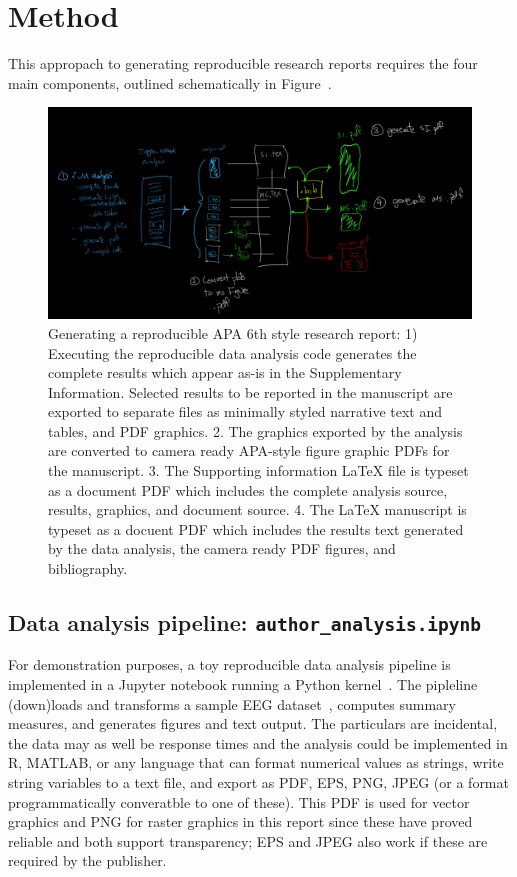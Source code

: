 \documentclass[helv,10pt,man,floatsintext]{apa6}  %
\begin{document}
\section{Method}

This appropach to generating reproducible research reports requires
the four main components, outlined schematically in
Figure~.

\begin{figure}[ht]
\caption{Generating a reproducible APA 6th style research report: 1)
  Executing the reproducible data analysis code generates the complete
  results which appear as-is in the Supplementary
  Information. Selected results to be reported in the manuscript are
  exported to separate files as minimally styled narrative text and
  tables, and PDF graphics. 2. The graphics exported by the analysis
  are converted to camera ready APA-style figure graphic PDFs for the
  manuscript. 3. The Supporting information \LaTeX{} file is typeset
  as a document PDF which includes the complete analysis source,
  results, graphics, and document source. 4. The \LaTeX{} manuscript
  is typeset as a docuent PDF which includes the results text
  generated by the data analysis, the camera ready PDF figures, and
  bibliography.}  
\includegraphics[width=.95\textwidth]{images/report_generation.png}

\end{figure}


\subsection{Data analysis pipeline: \texttt{author_analysis.ipynb}}

For demonstration purposes, a toy reproducible data analysis pipeline
is implemented in a Jupyter notebook running a Python
kernel~\cite{kluEtAl2016}.  The pipleline (down)loads and
transforms a sample EEG dataset~\cite{Urbach2020z}, computes summary
measures, and generates figures and text output. The particulars are
incidental, the data may as well be response times and the analysis
could be implemented in R, MATLAB, or any language that can format
numerical values as strings, write string variables to a text file,
and export as PDF, EPS, PNG, JPEG (or a format programmatically
converatble to one of these). This PDF is used for vector graphics and
PNG for raster graphics in this report since these have proved
reliable and both support transparency; EPS and JPEG also work if
these are required by the publisher.
\end{document}
